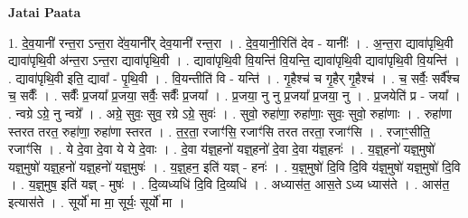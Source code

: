 \documentclass[17pt]{extarticle}
\begin{document}
\textbf{Jatai Paata} \newline

1. दे॒व॒यानी॑ रन्त॒रा ऽन्त॒रा दे॑व॒यानी᳚र् देव॒यानी॑ रन्त॒रा । . दे॒व॒यानी॒रिति॑ देव - यानीः᳚ । . अ॒न्त॒रा द्यावा॑पृथि॒वी द्यावा॑पृथि॒वी अ॑न्त॒रा ऽन्त॒रा द्यावा॑पृथि॒वी । . द्यावा॑पृथि॒वी वि॒यन्ति॑ वि॒यन्ति॒ द्यावा॑पृथि॒वी द्यावा॑पृथि॒वी वि॒यन्ति॑ । . द्यावा॑पृथि॒वी इति॒ द्यावा᳚ - पृ॒थि॒वी । . वि॒यन्तीति॑ वि - यन्ति॑ । . गृ॒हैश्च॑ च गृ॒हैर् गृ॒हैश्च॑ । . च॒ सर्वैः॒ सर्वै᳚श्च च॒ सर्वैः᳚ । . सर्वैः᳚ प्र॒जया᳚ प्र॒जया॒ सर्वैः॒ सर्वैः᳚ प्र॒जया᳚ । . प्र॒जया॒ नु नु प्र॒जया᳚ प्र॒जया॒ नु । . प्र॒जयेति॑ प्र - जया᳚ । . न्वग्रे ऽग्रे॒ नु न्वग्रे᳚ । . अग्रे॒ सुवः॒ सुव॒ रग्रे ऽग्रे॒ सुवः॑ । . सुवो॒ रुहा॑णा॒ रुहा॑णाः॒ सुवः॒ सुवो॒ रुहा॑णाः । . रुहा॑णा स्तरत तरत॒ रुहा॑णा॒ रुहा॑णा स्तरत । . त॒र॒ता॒ रजाꣳ॑सि॒ रजाꣳ॑सि तरत तरता॒ रजाꣳ॑सि । . रजाꣳ॒॒सीति॒ रजाꣳ॑सि । . ये दे॒वा दे॒वा ये ये दे॒वाः । . दे॒वा य॑ज्ञ्॒हनो॑ यज्ञ्॒हनो॑ दे॒वा दे॒वा य॑ज्ञ्॒हनः॑ । . य॒ज्ञ्॒हनो॑ यज्ञ्॒मुषो॑ यज्ञ्॒मुषो॑ यज्ञ्॒हनो॑ यज्ञ्॒हनो॑ यज्ञ्॒मुषः॑ । . य॒ज्ञ्॒हन॒ इति॑ यज्ञ् - हनः॑ । . य॒ज्ञ्॒मुषो॑ दि॒वि दि॒वि य॑ज्ञ्॒मुषो॑ यज्ञ्॒मुषो॑ दि॒वि । . य॒ज्ञ्॒मुष॒ इति॑ यज्ञ् - मुषः॑ । . दि॒व्यध्यधि॑ दि॒वि दि॒व्यधि॑ । . अध्यास॑त॒ आस॒ते ऽध्य ध्यास॑ते । . आस॑त॒ इत्यास॑ते । . सूर्यो॑ मा मा॒ सूर्यः॒ सूर्यो॑ मा । \newline
\end{document}
